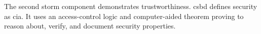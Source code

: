 \documentclass[../../main/main.tex]{subfiles}
\begin{document}
The second \gls{storm} component demonstrates trustworthiness.  \Gls{csbd} defines security as \gls{cia}.  It uses an access-control logic and computer-aided theorem proving to reason about, verify, and document security properties.

%
%
%
\end{document}
